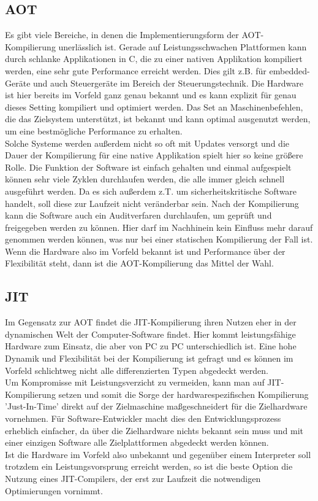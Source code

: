 \subsection{AOT}
Es gibt viele Bereiche, in denen die Implementierungsform der \ac{AOT}-Kompilierung unerlässlich ist. Gerade auf Leistungsschwachen Plattformen kann durch schlanke Applikationen in C, die zu einer nativen Applikation kompiliert werden, eine sehr gute Performance erreicht werden. Dies gilt z.B. für embedded-Geräte und auch Steuergeräte im Bereich der Steuerungstechnik. Die Hardware ist hier bereits im Vorfeld ganz genau bekannt und es kann explizit für genau dieses Setting kompiliert und optimiert werden. Das Set an Maschinenbefehlen, die das Zielsystem unterstützt, ist bekannt und kann optimal ausgenutzt werden, um eine bestmögliche Performance zu erhalten. \\
Solche Systeme werden außerdem nicht so oft mit Updates versorgt und die Dauer der Kompilierung für eine native Applikation spielt hier so keine größere Rolle. Die Funktion der Software ist einfach gehalten und einmal aufgespielt können sehr viele Zyklen durchlaufen werden, die alle immer gleich schnell ausgeführt werden. Da es sich außerdem z.T. um sicherheitskritische Software handelt, soll diese zur Laufzeit nicht veränderbar sein. Nach der Kompilierung kann die Software auch ein Auditverfaren durchlaufen, um geprüft und freigegeben werden zu können. Hier darf im Nachhinein kein Einfluss mehr darauf genommen werden können, was nur bei einer statischen Kompilierung der Fall ist.\\
Wenn die Hardware also im Vorfeld bekannt ist und Performance über der Flexibilität steht, dann ist die \ac{AOT}-Kompilierung das Mittel der Wahl.

\subsection{JIT}
Im Gegensatz zur \ac{AOT} findet die \ac{JIT}-Kompilierung ihren Nutzen eher in der dynamischen Welt der Computer-Software findet. Hier kommt leistungsfähige Hardware zum Einsatz, die aber von PC zu PC unterschiedlich ist. Eine hohe Dynamik und Flexibilität bei der Kompilierung ist gefragt und es können im Vorfeld schlichtweg nicht alle differenzierten Typen abgedeckt werden. \\
Um Kompromisse mit Leistungsverzicht zu vermeiden, kann man auf \ac{JIT}-Kompilierung setzen und somit die Sorge der hardwarespezifischen Kompilierung 'Just-In-Time' direkt auf der Zielmaschine maßgeschneidert für die Zielhardware vornehmen. Für Software-Entwickler macht dies den Entwicklungsprozess erheblich einfacher, da über die Zielhardware nichts bekannt sein muss und mit einer einzigen Software alle Zielplattformen abgedeckt werden können. \\
Ist die Hardware im Vorfeld also unbekannt und gegenüber einem Interpreter soll trotzdem ein Leistungsvorsprung erreicht werden, so ist die beste Option die Nutzung eines \ac{JIT}-Compilers, der erst zur Laufzeit die notwendigen Optimierungen vornimmt. 


